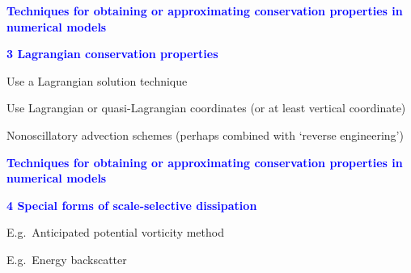\documentclass[a4]{seminar}
\newcommand{\B}[1]{\textcolor{blue}{#1}}
\begin{document}

\begin{slide}

\B{\bf Techniques for obtaining or approximating conservation
properties in numerical models}

\vspace{3mm}

\B{\bf 3 Lagrangian conservation properties}

\vspace{2mm}

Use a Lagrangian solution technique

\vspace{2mm}

Use Lagrangian or quasi-Lagrangian coordinates
(or at least vertical coordinate)

\vspace{2mm}

Nonoscillatory advection schemes (perhaps combined with `reverse engineering')


\end{slide}


\begin{slide}

\B{\bf Techniques for obtaining or approximating conservation
properties in numerical models}

\vspace{3mm}

\B{\bf 4 Special forms of scale-selective dissipation}

\vspace{3mm}

E.g.\ Anticipated potential vorticity method

\vspace{3mm}

E.g.\ Energy backscatter

\end{slide}

\end{document}
